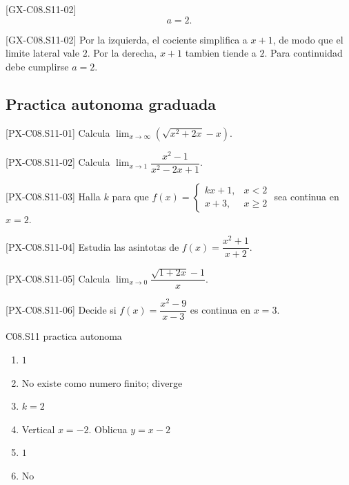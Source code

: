 \begin{shortanswer}{[GX-C08.S11-02]}
\[
a=2.
\]
\end{shortanswer}

\begin{fullsolution}{[GX-C08.S11-02]}
Por la izquierda, el cociente simplifica a \(x+1\), de modo que el limite lateral vale \(2\).
Por la derecha, \(x+1\) tambien tiende a \(2\). Para continuidad debe cumplirse \(a=2\).
\end{fullsolution}

\subsection*{Practica autonoma graduada}
\begin{exercise}{[PX-C08.S11-01] Calcula \(\lim_{x\to\infty}\left(\sqrt{x^2+2x}-x\right)\).}
\end{exercise}
\begin{exercise}{[PX-C08.S11-02] Calcula \(\lim_{x\to 1}\dfrac{x^2-1}{x^2-2x+1}\).}
\end{exercise}
\begin{exercise}{[PX-C08.S11-03] Halla \(k\) para que \(f(x)=\begin{cases}kx+1,&x<2\\x+3,&x\geq2\end{cases}\) sea continua en \(x=2\).}
\end{exercise}
\begin{exercise}{[PX-C08.S11-04] Estudia las asintotas de \(f(x)=\dfrac{x^2+1}{x+2}\).}
\end{exercise}
\begin{exercise}{[PX-C08.S11-05] Calcula \(\lim_{x\to 0}\dfrac{\sqrt{1+2x}-1}{x}\).}
\end{exercise}
\begin{exercise}{[PX-C08.S11-06] Decide si \(f(x)=\dfrac{x^2-9}{x-3}\) es continua en \(x=3\).}
\end{exercise}

\begin{shortanswer}{C08.S11 practica autonoma}
\begin{enumerate}[label=\textbf{PX-C08.S11-\arabic*:}, leftmargin=*]
  \item \(1\)
  \item No existe como numero finito; diverge
  \item \(k=2\)
  \item Vertical \(x=-2\). Oblicua \(y=x-2\)
  \item \(1\)
  \item No
\end{enumerate}
\end{shortanswer}

